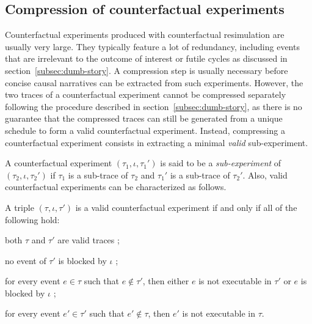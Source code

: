 \subsection{Compression of counterfactual experiments}

Counterfactual experiments produced with counterfactual resimulation
are usually very large. They typically feature a lot of redundancy,
including events that are irrelevant to the outcome of interest or
futile cycles as discussed in section~\ref{subsec:dumb-story}. A
compression step is usually necessary before concise causal narratives
can be extracted from such experiments. However, the two traces of a
counterfactual experiment cannot be compressed separately following
the procedure described in section~\ref{subsec:dumb-story}, as there
is no guarantee that the compressed traces can still be generated from
a unique schedule to form a valid counterfactual experiment. Instead,
compressing a counterfactual experiment consists in extracting a
minimal \emph{valid} sub-experiment.

A counterfactual experiment $(\tau_1, \iota, \tau_1')$ is said to be a
\emph{sub-experiment} of $(\tau_2, \iota, \tau_2')$ if $\tau_1$ is a
sub-trace of $\tau_2$ and $\tau_1'$ is a sub-trace of $\tau_2'$. Also,
valid counterfactual experiments can be characterized as follows.

\begin{proposition}%
  \label{prop:valid-cex}
  A triple $(\tau, \iota, \tau')$ is a valid counterfactual experiment
  if and only if all of the following hold:
  \begin{inparaenum}[(1)]
  \item \label{valid-cex:valid-traces} both $\tau$ and $\tau'$ are
    valid traces ;
  \item \label{valid-cex:no-blocking} no event of $\tau'$ is blocked
    by $\iota$ ;
  \item \label{valid-cex:co-occur} for every event $e \in \tau$ such
    that $e \notin \tau'$, then either $e$ is not executable in
    $\tau'$ or $e$ is blocked by $\iota$ ;
  \item \label{valid-cex:co-occur2} for every event $e' \in \tau'$
    such that $e' \notin \tau$, then $e'$ is not executable in $\tau$.
  \end{inparaenum}
\end{proposition}

